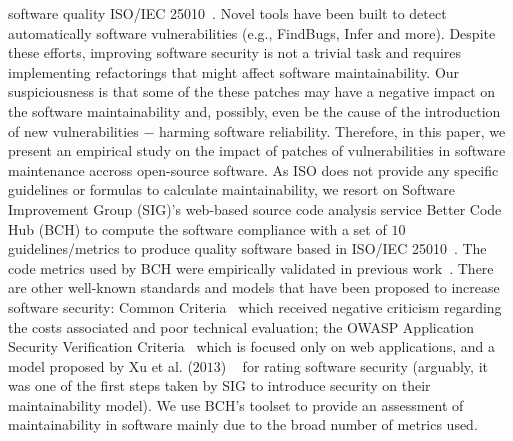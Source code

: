 \documentclass[sigconf,review]{acmart}
\begin{document}
software quality ISO/IEC 25010~\cite{iso:2011}. Novel tools have been built to 
detect automatically software vulnerabilities (e.g., FindBugs, Infer and more). 
%
Despite these efforts, improving software security is not a trivial task and requires 
implementing refactorings that might affect software maintainability. 
Our suspiciousness is that some of the these patches may have a negative 
impact on the software maintainability and, possibly, even be the cause of the 
introduction of new vulnerabilities $-$ harming software reliability. Therefore, 
in this paper, we present an empirical study on the impact of patches of 
vulnerabilities in software maintenance accross open-source software.
%
%
As ISO does not provide any specific guidelines or formulas to calculate 
maintainability, we resort on Software Improvement Group (SIG)'s web-based source 
code analysis service Better Code Hub (BCH) to compute the software compliance 
with a set of $10$ guidelines/metrics to produce quality software 
based in ISO/IEC 25010~\cite{Visser:2016:OREILLY}. The code metrics used by BCH 
were empirically validated in previous work~\cite{Bijlsma:2012:FIR:2317098.2317124, 8530041}. 
There are other well-known standards and models that have been proposed
to increase software security: Common Criteria~\cite{common:2009} which received
negative criticism regarding the costs associated and poor technical evaluation;
the OWASP Application Security Verification Criteria~\cite{oswap:2009} which is
focused only on web applications, and a model proposed by Xu et al. ($2013$)
~\cite{6616351} for rating software security (arguably, it was one of the
first steps taken by SIG to introduce security on their maintainability model). 
%
We use BCH's toolset to provide an assessment of maintainability in 
software mainly due to the broad number of metrics used.
\end{document}
